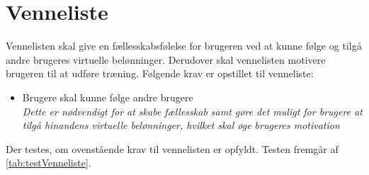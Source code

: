 \section{Venneliste}
Vennelisten skal give en fællesskabsfølelse for brugeren ved at kunne følge og tilgå andre brugeres virtuelle belønninger. Derudover skal vennelisten motivere brugeren til at udføre træning. Følgende krav er opstillet til venneliste: 

\begin{itemize}
\item Brugere skal kunne følge andre brugere
\\
\textit{Dette er nødvendigt for at skabe fællesskab samt gøre det muligt for brugere at tilgå hinandens virtuelle belønninger, hvilket skal øge brugeres motivation}
\end{itemize}

\noindent
Der testes, om ovenstående krav til vennelisten er opfyldt. Testen fremgår af \autoref{tab:testVenneliste}.

